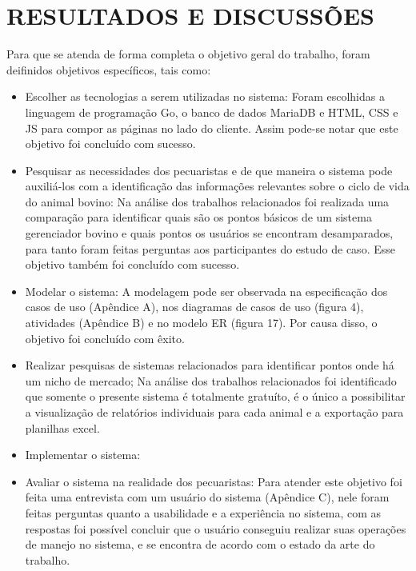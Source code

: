 %
%


\chapter{\textbf{RESULTADOS E DISCUSSÕES}}\label{chap:resultados}

Para que se atenda de forma completa o objetivo geral do trabalho, foram deifinidos objetivos específicos, tais como:
\begin{itemize}
	\item Escolher as tecnologias a serem utilizadas no sistema:
	Foram escolhidas a linguagem de programação Go, o banco de dados MariaDB e HTML, CSS e JS para compor as páginas no lado do cliente. Assim pode-se notar que este objetivo foi concluído com sucesso.

	\item Pesquisar as necessidades dos pecuaristas e de que maneira o sistema pode auxiliá-los com a identificação das informações relevantes sobre o ciclo de vida do animal bovino:
	Na análise dos trabalhos relacionados foi realizada uma comparação para identificar quais são os pontos básicos de um sistema gerenciador bovino e quais pontos os usuários se encontram desamparados, para tanto foram feitas perguntas aos participantes do estudo de caso. Esse objetivo também foi concluído com sucesso.

	\item Modelar o sistema:
	A modelagem pode ser observada na especificação dos casos de uso (Apêndice A),  nos diagramas de casos de uso (figura 4), atividades (Apêndice B) e no modelo ER (figura 17). Por causa disso, o objetivo foi concluído com êxito.


	\item Realizar pesquisas de sistemas relacionados para identificar pontos onde há um nicho de mercado;
	Na análise dos trabalhos relacionados foi identificado que somente o presente sistema é totalmente gratuíto, é o único a possibilitar a visualização de relatórios individuais para cada animal e a exportação para planilhas excel. 

	\item Implementar o sistema:
	

	\item Avaliar o sistema na realidade dos pecuaristas:
	Para atender este objetivo foi feita uma entrevista com um usuário do sistema (Apêndice C), nele foram feitas perguntas quanto a usabilidade e a experiência no sistema, com as respostas foi possível concluir que o usuário conseguiu realizar suas operações de manejo no sistema, e se encontra de acordo com o estado da arte do trabalho.
\end{itemize}
